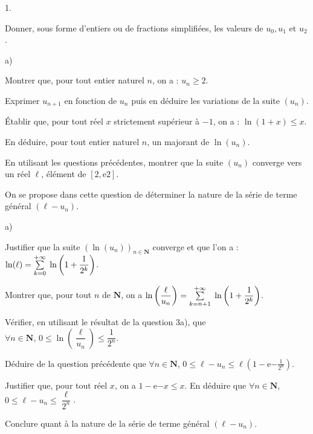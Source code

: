 \documentclass[11pt]{article}%
\begin{document}
\begin{noliste}{1.}
 \setlength{\itemsep}{4mm}
\item Donner, sous forme d'entiers ou de fractions simplifiées, les
valeurs
de $u_{0},u_{1}$ et $u_{2}$.

\item 
\begin{noliste}{a)}
 \setlength{\itemsep}{2mm}
\item Montrer que, pour tout entier naturel $n$, on a : $u_{n}\geq 2$.

\item Exprimer $u_{n + 1}$ en fonction de $u_{n}$ puis en déduire les
variations de la suite $(u_{n})$.

\item 
Établir que, pour tout réel $x$ strictement supérieur à $-1$, on a :
$\ln
(1 + x)\leq x$.

\item En déduire, pour tout entier naturel $n$, un majorant de $\ln
(u_{n})$.
\end{noliste}

\item En utilisant les questions précédentes, montrer que la suite
$(u_{n})$
converge vers un réel $\ell$, élément de
$\left[2,\mathrm{e}{2}\right]$.

\item On se propose dans cette question de déterminer la nature de la
série
de terme général $(\ell -u_{n})$.

\begin{noliste}{a)}
 \setlength{\itemsep}{2mm}
\item Justifier que la suite $(\ln (u_{n}))_{n\in {\mathbf{N}}}$
converge et
que l'on a : $\ln (\ell ) = {\textstyle\sum\limits_{k = 0}^{+ \infty }}\hspace{.1cm}\ln \left( 1 +
\dfrac{1}{2^{k}}\right) $.

\item Montrer que, pour tout $n$ de ${\mathbf{N}}$, on a $\ln \left(
\dfrac{\ell }{u_{n}}\right) = {\textstyle\sum\limits_{k = n + 1}^{+ \infty }}\hspace{.1cm}\ln \left( 1 +
\dfrac{1}{2^{k}}\right) $.

\item Vérifier, en utilisant le résultat de la question 3a), que
$\forall
n\in {\mathbf{N}},\,0\leq \ln \left( \dfrac{\ell }{u_{n}}\right) \leq
\dfrac{1}{2^{n}}$.

\item Déduire de la question précédente que $\forall n\in
{\mathbf{N}}$, $0\leq \ell -u_{n}\leq \ell \left(
1-\mathrm{e}{-\frac{1}{2^{n}}}\right) $.

\item Justifier que, pour tout réel $x$, on a $1-\mathrm{e}{-x}\leq x$.
En déduire que $\forall n\in {\mathbf{N}}$, $0\leq \ell -u_{n}\leq
\dfrac{\ell }{2^{n}}$.

Conclure quant à la nature de la série de terme général $(\ell
-u_{n})$.
\end{noliste}
\end{noliste}
\end{document}
